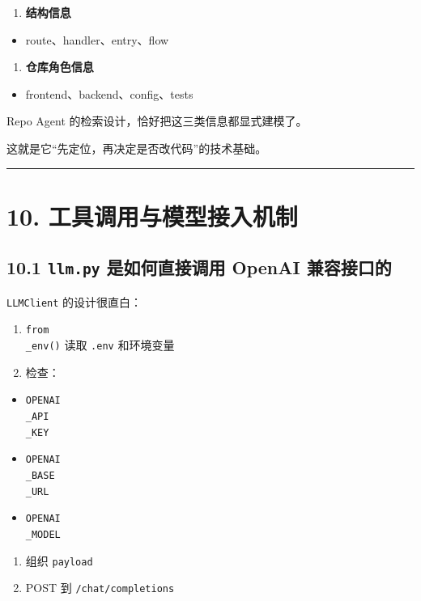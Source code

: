 \documentclass[UTF8,12pt,openany]{ctexbook}
\begin{document}
\begin{enumerate}
\item \textbf{结构信息}
\end{enumerate}
\begin{itemize}
\item route、handler、entry、flow
\end{itemize}

\begin{enumerate}
\item \textbf{仓库角色信息}
\end{enumerate}
\begin{itemize}
\item frontend、backend、config、tests
\end{itemize}

Repo Agent 的检索设计，恰好把这三类信息都显式建模了。\par

这就是它“先定位，再决定是否改代码”的技术基础。\par

\hrule

\section{10. 工具调用与模型接入机制}

\subsection{10.1 \texttt{llm.py} 是如何直接调用 OpenAI 兼容接口的}

\texttt{LLMClient} 的设计很直白：\par

\begin{enumerate}
\item \texttt{from\\_env()} 读取 \texttt{.env} 和环境变量
\item 检查：
\end{enumerate}
\begin{itemize}
\item \texttt{OPENAI\\_API\\_KEY}
\item \texttt{OPENAI\\_BASE\\_URL}
\item \texttt{OPENAI\\_MODEL}
\end{itemize}
\begin{enumerate}
\item 组织 \texttt{payload}
\item POST 到 \texttt{/chat/completions}
\end{enumerate}
\end{document}
